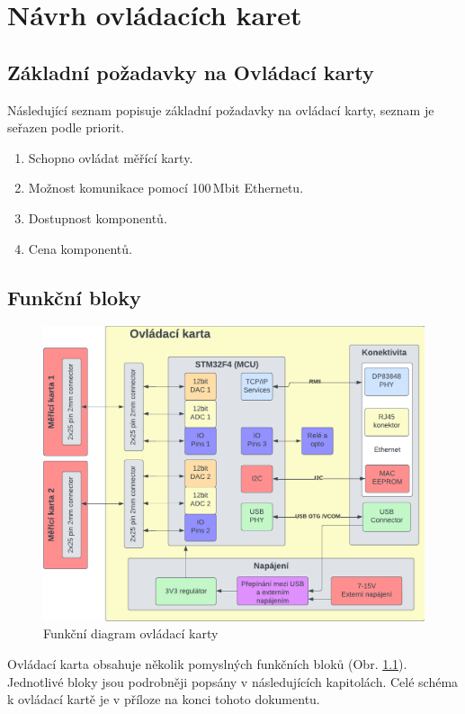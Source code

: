 \chapter{Návrh ovládacích karet}
\section{Základní požadavky na Ovládací karty}
    Následující seznam popisuje základní požadavky na ovládací karty, seznam je seřazen podle priorit.
    \begin{enumerate}
        \item Schopno ovládat měřící karty.
        \item Možnost komunikace pomocí 100\,Mbit Ethernetu.
        \item Dostupnost komponentů.
        \item Cena komponentů.
    \end{enumerate}

    \section{Funkční bloky}
    \begin{figure}[ht!]
        \centering
        \includegraphics[width = 1\textwidth]{obrazky/ovladaci_karta_diag.png}
        \caption{Funkční diagram ovládací karty}
        \label{fig:Funkční diagram ovládací karty}
        
    \end{figure}

    Ovládací karta obsahuje několik pomyslných funkčních bloků (Obr. \ref{fig:Funkční diagram ovládací karty}).
    Jednotlivé bloky jsou podrobněji popsány v následujících kapitolách. Celé schéma k ovládací kartě je v příloze
    na konci tohoto dokumentu.

